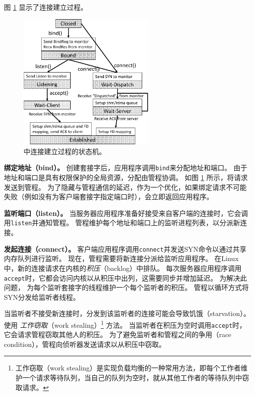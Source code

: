 图 \ref {socksdirect:fig:conn-setup} 显示了连接建立过程。


\begin{figure}[htbp]
	\centering
	\includegraphics[width=0.6\textwidth]{images/conn-setup-new}
	\caption{\libipc{} 中连接建立过程的状态机。}
	\label{socksdirect:fig:conn-setup}
\end{figure}



\textbf{绑定地址（bind）。}
创建套接字后，应用程序调用\texttt {bind}来分配地址和端口。
由于地址和端口是具有权限保护的全局资源，分配由管程协调。
如图 \ref {socksdirect:fig:conn-setup} 所示，\libipc {}将请求发送到管程。
为了隐藏与管程通信的延迟，作为一个优化，如果绑定请求不可能失败（例如没有为客户端套接字指定端口时），\libipc {}会立即返回应用程序。

\textbf{监听端口（listen）。}
当服务器应用程序准备好接受来自客户端的连接时，它会调用\texttt {listen}并通知管程。
管程维护每个地址和端口上的监听进程列表，以分派新连接。


\textbf{发起连接（connect）。}
客户端应用程序调用\texttt {connect}并发送SYN命令以通过共享内存队列进行监听。
现在，管程需要将新连接分派给监听应用程序。
在Linux中，新的连接请求在内核的\emph {积压}（backlog）中排队。
每次服务器应用程序调用\texttt {accept}时，它都会访问内核以从积压中出列，这需要同步并增加延迟。
为解决此问题，\sys{} 为每个监听套接字的线程维护一个每个监听者的积压。
管程以循环方式将SYN分发给监听者线程。

当监听者不接受新连接时，分发到该监听者的连接可能会导致饥饿（starvation）。
\sys{} 使用 \emph {工作窃取}（work stealing）\footnote{工作窃取（work stealing）是实现负载均衡的一种常用方法，即每个工作者维护一个请求等待队列，当自己的队列为空时，就从其他工作者的等待队列中窃取请求。} 方法。
当监听者在积压为空时调用\texttt {accept}时，它会请求管程窃取其他人的积压。
为了避免监听者和管程之间的争用（race condition），管程向侦听器发送请求以从积压中窃取。

